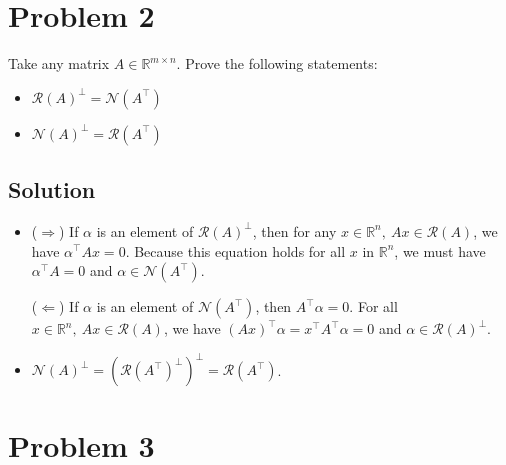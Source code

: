 \documentclass[11pt]{report}
\newcommand{\mc}{\mathcal}
\newcommand{\mb}{\mathbb}
\newcommand{\T}{\intercal}
\begin{document}
\pagebreak
\section*{Problem 2}

Take any matrix $A \in \mb{R}^{m \times n}$. Prove the following statements:
\begin{itemize}
\item $\mc{R}(A)^\bot = \mc{N}(A^\T)$
\item $\mc{N}(A)^\bot = \mc{R}(A^\T)$
\end{itemize}


\subsection*{Solution}
\begin{itemize}
\item
($\Rightarrow$) If $\alpha$ is an element of $\mc{R}(A)^\bot$, then for any $x \in \mb{R}^n,~Ax \in \mc{R}(A)$, we have $\alpha^\T A x = 0$. Because this equation holds for all $x$ in $\mb{R}^n$, we must have $\alpha^\T A = 0$ and $\alpha \in \mc{N}(A^\T)$.

($\Leftarrow$) If $\alpha$ is an element of $\mc{N}(A^\T)$, then $A^\T \alpha = 0$. For all $x \in \mb{R}^n,~Ax \in \mc{R}(A)$, we have $(A x)^\T \alpha  = x^\T A^\T \alpha = 0$ and $\alpha \in \mc{R}(A)^\bot$.

\item
$\mc{N}(A)^\bot = (\mc{R}(A^\T)^\bot)^\bot = \mc{R}(A^\T)$.
\end{itemize}

\pagebreak
\section*{Problem 3}
\end{document}
